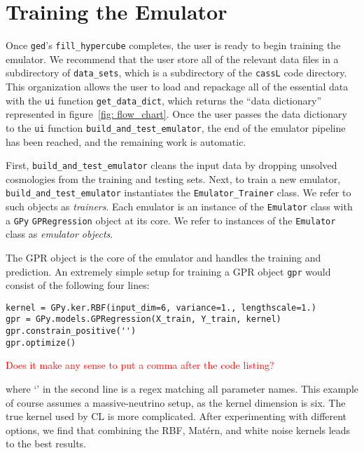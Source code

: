 

\section{Training the Emulator}
\label{sec: train_emu}


Once \texttt{ged}'s \verb|fill_hypercube| completes, the user is ready to
begin training the emulator. We recommend that the user store all of the
relevant data files in a subdirectory of \verb|data_sets|, which is a
subdirectory of the \texttt{cassL} code directory. This organization
allows the user to load and repackage all of the essential data with the
\texttt{ui} function \verb|get_data_dict|, which returns the
``data dictionary'' represented in figure~\ref{fig: flow_chart}.
Once the user passes the data dictionary to the \texttt{ui} function
\verb|build_and_test_emulator|, the end of the emulator pipeline has been 
reached, and the remaining work is automatic.

First, \verb|build_and_test_emulator| cleans the input data by dropping
unsolved cosmologies from the training and testing sets. Next, to train a new 
emulator, \\
\verb|build_and_test_emulator| instantiates the
\verb|Emulator_Trainer| class. We refer to such objects as \textit{trainers}.
Each emulator is an instance of
the \texttt{Emulator} class with a \texttt{GPy}
\texttt{GPRegression} object at its core. We 
refer to instances of the \texttt{Emulator} class as \textit{emulator 
objects}.

The GPR object is the core of the emulator and handles the training
and prediction. An extremely simple setup for training a GPR object
\texttt{gpr} would consist of the following four lines:

\begin{verbatim}
kernel = GPy.ker.RBF(input_dim=6, variance=1., lengthscale=1.)
gpr = GPy.models.GPRegression(X_train, Y_train, kernel)
gpr.constrain_positive('')
gpr.optimize()
\end{verbatim}

\textcolor{red}{Does it make any sense to put a comma after the code listing?}

where `' in the second line is a regex matching all parameter names. This
example of course assumes a massive-neutrino setup, as the kernel dimension is
six. The true kernel used by CL is more complicated. After experimenting with
different options, we find that combining the RBF, Mat\'{e}rn, and white noise
kernels leads to the best results.


